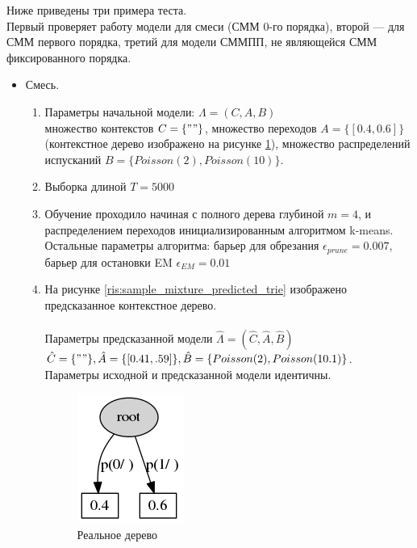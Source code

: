 \documentclass{matmex-diploma-custom}
\begin{document}
Ниже приведены три примера теста.
\\Первый проверяет работу модели для смеси (СММ 0-го порядка), второй --- для СММ первого порядка, третий для модели СММПП, не являющейся СММ фиксированного порядка.
\begin{itemize}
\item Смесь.
\begin{enumerate}
\item Параметры начальной модели: $\Lambda = (C, A, B)$ 
\\множество контекстов $C = \{""\}$, множество переходов $A = \{[0.4, 0.6]\}$ (контекстное дерево изображено на рисунке \ref{ris:sample_mixture_real_trie}), множество распределений испусканий $B = \{Poisson(2), Poisson(10)\}$. 
\item Выборка длиной $ T = 5000 $
\item Обучение проходило начиная с полного дерева глубиной $ m  = 4$, и распределением переходов инициализированным алгоритмом k-means. 
\\Остальные параметры алгоритма: барьер для обрезания $ \epsilon_{prune} = 0.007$, барьер для остановки EM $ \epsilon_{EM} =  0.01 $      
\item  На рисунке \ref{ris:sample_mixture_predicted_trie} изображено предсказанное контекстное дерево. 
\\
\\Параметры предсказанной модели $\hat{\Lambda} = (\hat{C}, \hat{A}, \hat{B})$  
\\$\hat{C} = \{""\}, \hat{A} = \{[0.41, .59]\}, \hat{B} = \{Poisson(2), Poisson(10.1)\}$.
\\Параметры исходной и предсказанной модели идентичны.
\begin{figure}[h!]\centering
\begin{minipage}[b]{0.49 \textwidth}
	\includegraphics[scale=0.57]{img/sample_mixture/real_trie_.png}
	\centering
	\caption{ Реальное дерево }
	\label{ris:sample_mixture_real_trie}
\end{minipage}
\hfil \hfil%
\begin{minipage}[b]{0.49 \textwidth}

\end{minipage}
\end{figure}
\end{enumerate}
\end{itemize}
\end{document}
